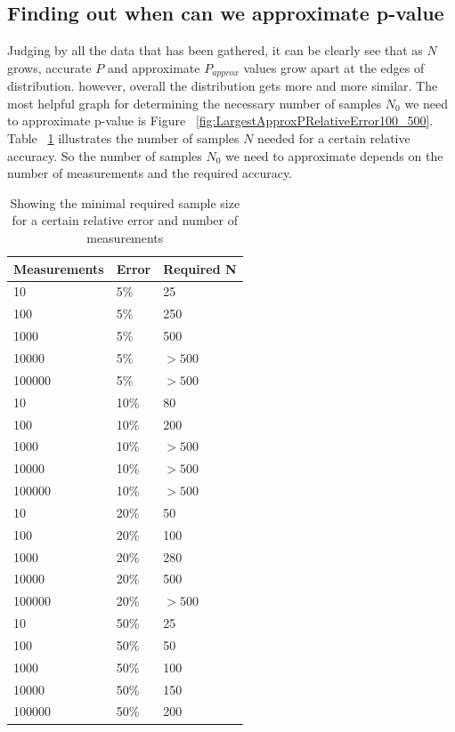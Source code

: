 \documentclass[12pt]{article}
\begin{document}
{\subsection{Finding out when can we approximate p-value}
Judging by all the data that has been gathered, it can be clearly see that as $N$ grows, accurate $P$ and approximate $P_{approx}$ values grow apart at the edges of distribution. however, overall the distribution gets more and more similar. The most helpful graph for determining the necessary number of samples $N_0$ we need to approximate p-value is Figure ~\ref{fig:LargestApproxPRelativeError100_500}. Table ~\ref{table:requiredN} illustrates the number of samples $N$ needed for a certain relative accuracy. So the number of samples $N_0$ we need to approximate depends on the number of measurements and the required accuracy.

\begin{table}[H]
	\begin{center}
		\caption{Showing the minimal required sample size for a certain relative error and number of measurements}
	    \begin{tabular}{| l | l | l |}
	    \hline
		Measurements & Error & Required N \\
		\hline
		10 & 5\% & 25 \\
    \hline
		100 & 5\% & 250 \\
    \hline
		1000 & 5\% & 500 \\
    \hline
		10000 & 5\% & $>500$ \\
    \hline
		100000 & 5\% & $> 500$ \\
    \hline
		\hline
		10  & 10\% & 80 \\
    \hline
		100 & 10\% & 200 \\
    \hline
		1000 & 10\% & $>500$ \\
    \hline
		10000 & 10\% & $>500$ \\
    \hline
		100000  & 10\% & $>500$ \\
		\hline
    \hline
		10  & 20\% & 50 \\
    \hline
		100 & 20\% & 100 \\
    \hline
		1000  & 20\% & 280 \\
    \hline
		10000  & 20\% & 500 \\
    \hline
		100000  & 20\% & $>500$ \\
    \hline
    \hline
		10  & 50\% &  25 \\
    \hline
		100 & 50\% & 50 \\
    \hline
		1000 & 50\% & 100 \\
    \hline
		10000 & 50\% & 150 \\
    \hline
		100000 & 50\% & 200 \\
		\hline
		\end{tabular}
		\label{table:requiredN}
	\end{center}
\end{table}

}
\end{document}
